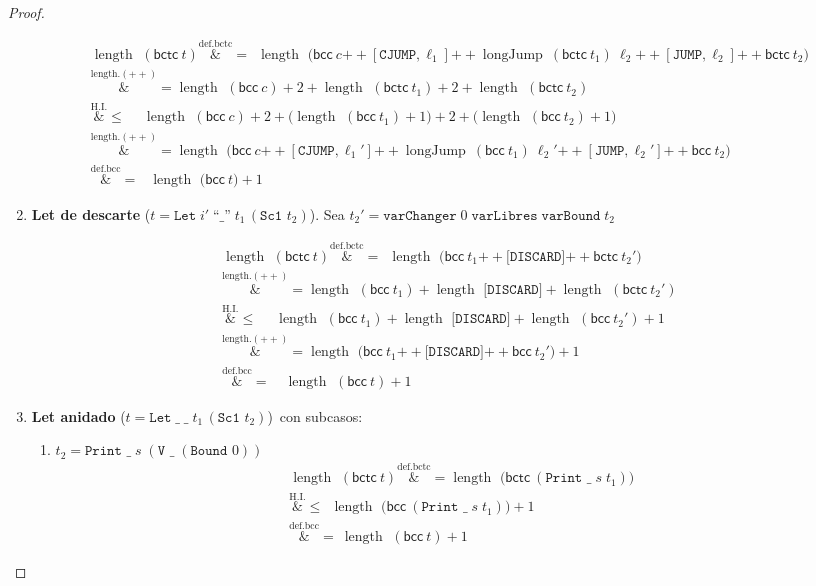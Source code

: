 \documentclass[12pt]{article}
\newcommand{\length}{\operatorname{length\  }}
\DeclareMathOperator{\longJumpOp}{longJump}
\newcommand{\longJump}[2]{\longJumpOp\ #1\ #2}
\newcommand{\bcc}[1]{\mathsf{bcc}\ #1}
\newcommand{\bctc}[1]{\mathsf{bctc}\ #1}
\newcommand{\concat}{\mathbin{+\!\!+}}   %
\theoremstyle{remark}
\newcommand{\overeqa}[1]{\overset{\mathrm{#1}}&{=}}
\newcommand{\overlea}[1]{\overset{\mathrm{#1}}&{\le}}
\begin{document}
\begin{proof}
\begin{enumerate}[label=\textbf{(\alph*)},wide,topsep=4pt]
\begin{align*}
\length(\bctc{t}) \overeqa{def.bctc} \ \ \length\!\bigl(\bcc{c}\concat
    [\texttt{CJUMP},\ell_1]\concat
    \longJump{(\bctc{t_1})}{{\ell_2}}\concat
    [\texttt{JUMP},\ell_2]\concat
    \bctc{t_2}\bigr) \\
 \overeqa{length.(++)} \length(\bcc{c})+2+\length(\bctc{t_1})+2+\length(\bctc{t_2}) \\
 \overlea{H.I.} \quad \  \length(\bcc{c})+2+\bigl(\length(\bcc{t_1})+1\bigr)+2+\bigl(\length(\bcc{t_2})+1\bigr) \\
 \overeqa{length.(++)}  \length\!\bigl(\bcc{c}\concat
    [\texttt{CJUMP},\ell_1']\concat
    \longJump{(\bcc{t_1})}{{\ell_2'}}\concat
    [\texttt{JUMP},\ell_2']\concat
    \bcc{t_2}\bigr) \\
 \overeqa{def.bcc} \ \ \; \length\bigl(\bcc{t}\bigr)+1 
\end{align*}

\item \textbf{Let de descarte}  
    ($t=\texttt{Let}\; i' \; \texttt{``\_''} \;t_1\,(\texttt{Sc1 }t_2)$). 
    Sea $ t_2' = \texttt{varChanger} \; 0 \; \texttt{varLibres} \; \texttt{varBound} \; t_2 $

\begin{align*}
\length(\bctc{t}) \overeqa{def.bctc} \ \ \length\!\bigl(      \bcc{t_1} \concat \texttt{[DISCARD]} \concat \bctc{t_2'}       \bigr)  \\ 
\overeqa{length.(++)} \length (\bcc{t_1}) + \length \texttt{[DISCARD]} + \length (\bctc{t_2'}) \\ 
  \overlea{H.I.} \quad \; \length (\bcc{t_1}) + \length \texttt{[DISCARD]} + \length (\bcc{t_2'}) + 1 \\
  \overeqa{length.(++)} \length\!\bigl(      \bcc{t_1} \concat \texttt{[DISCARD]} \concat \bcc{t_2'}       \bigr) + 1\\
  \overeqa{def.bcc} \quad \length(\bcc{t}) + 1
\end{align*}

\item \textbf{Let anidado}  
      ($t=\texttt{Let}\;\_\;\_\;t_1\,(\texttt{Sc1 }t_2)$)\, con subcasos:

\begin{enumerate}[label=\textbf{(\roman*)}, leftmargin=6em]
  \item $t_2=\texttt{Print }\_\;s\;(\texttt{V }\_\;(\texttt{Bound }0))$
  \begin{align*}
      \length(\bctc{t}) \overeqa{def.bctc} \length\bigl(\bctc{(\texttt{Print }\_\;s\;t_1)}\bigr) \\ 
      \overlea{H.I.} \ \ \length\bigl(\bcc{(\texttt{Print }\_\;s\;t_1)}\bigr)+1 \\
      \overeqa{def.bcc} \  \length(\bcc{t})+1 
  \end{align*}
  

\end{enumerate}
\end{enumerate}
\end{proof}
\end{document}
